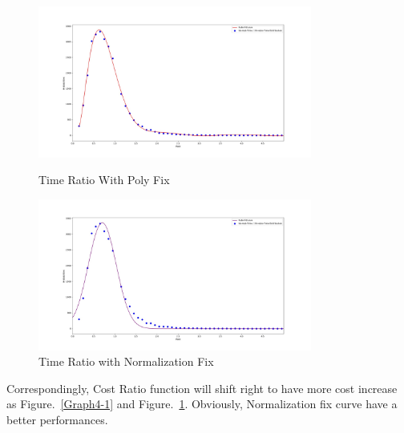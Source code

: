 \documentclass{llncs}
\begin{document}
\begin{figure}[htbp]
\centering
\begin{minipage}[t]{0.48\textwidth}
\centering
\includegraphics[width=9cm]{graph/time_pro1pro2_poly.jpg}
\caption{Time Ratio With Poly Fix}
\label{Graph4-1}
\end{minipage}
\begin{minipage}[t]{0.48\textwidth}
\centering
\includegraphics[width=9cm]{graph/time_pro1pro2_norm.jpg}
\caption{Time Ratio with Normalization Fix}
\label{Graph4-2}
\end{minipage}
\end{figure}

Correspondingly, Cost Ratio function will shift right to have more cost increase as Figure.~\ref{Graph4-1} and Figure.~\ref{Graph4-2}. Obviously, Normalization fix curve have a better performances.
\end{document}
